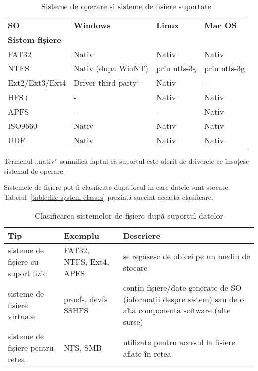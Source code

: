 \begin{table}[htb]
\caption{Sisteme de operare și sisteme de fișiere suportate}
\begin{center}
	\begin{tabular}{ p{} p{} p{} p{} }
	\toprule
		\textbf{SO} & \textbf{Windows} & \textbf{Linux} & \textbf{Mac OS} \\
		\textbf{Sistem fișiere} & & & \\
	\midrule
		FAT32 & Nativ & Nativ & Nativ \\
	\midrule
		NTFS & Nativ (dupa WinNT) & prin ntfs-3g & prin ntfs-3g \\
	\midrule
		Ext2/Ext3/Ext4 & Driver third-party & Nativ & - \\
	\midrule
		HFS+ & - & Nativ & Nativ \\
        \midrule
                APFS & - & - & Nativ \\
	\midrule
		ISO9660 & Nativ & Nativ & Nativ \\
	\midrule
		UDF & Nativ & Nativ & Nativ \\
	\bottomrule
	\end{tabular}
	\label{table:file-system-backup-fs-types}
\end{center}
\end{table}

Termenul ,,nativ'' semnifică faptul că suportul este oferit de driverele ce
însoțesc sistemul de operare.

Sistemele de fișiere pot fi clasificate după locul în care datele sunt stocate. Tabelul~\ref{table:file-system-classes} prezintă succint această clasificare.

\begin{table}[htb]
\caption{Clasificarea sistemelor de fișiere după suportul datelor}
\begin{center}
	\begin{tabular}{ p{} p{} p{} }
	\toprule
		\textbf{Tip} & \textbf{Exemplu} & \textbf{Descriere} \\
	\midrule
		sisteme de fișiere cu suport fizic & 	FAT32, NTFS, Ext4, APFS & se
		regăsesc de obicei pe un mediu de stocare \\
	\midrule
		sisteme de fișiere virtuale & procfs, devfs SSHFS & conțin fișiere/date generate
		de SO (informații despre sistem) sau de o altă componentă software (alte surse) \\
	\midrule
		sisteme de fișiere pentru rețea & NFS, SMB & utilizate pentru accesul la
		fișiere aflate în rețea \\
	\bottomrule
	\end{tabular}
	\label{table:file-system-fs-classes}
\end{center}
\end{table}

